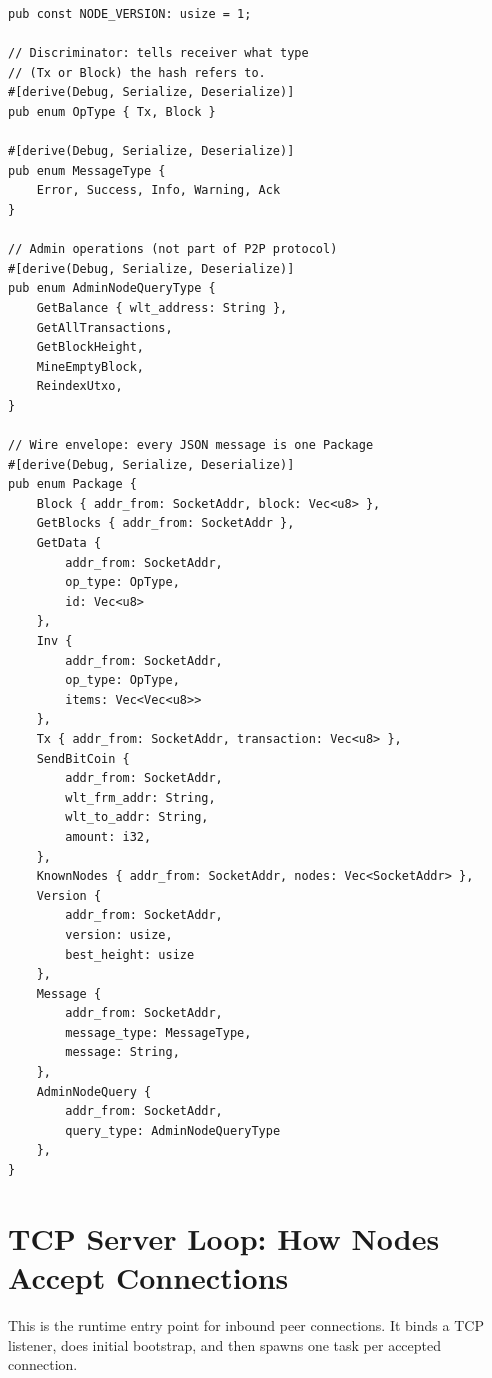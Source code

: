 \begin{listing}[htbp]
\caption{Network globals and message type enums}
\label{lst:ch12-message-model}
\begin{verbatim}
pub const NODE_VERSION: usize = 1;

// Discriminator: tells receiver what type
// (Tx or Block) the hash refers to.
#[derive(Debug, Serialize, Deserialize)]
pub enum OpType { Tx, Block }

#[derive(Debug, Serialize, Deserialize)]
pub enum MessageType {
    Error, Success, Info, Warning, Ack
}

// Admin operations (not part of P2P protocol)
#[derive(Debug, Serialize, Deserialize)]
pub enum AdminNodeQueryType {
    GetBalance { wlt_address: String },
    GetAllTransactions,
    GetBlockHeight,
    MineEmptyBlock,
    ReindexUtxo,
}

// Wire envelope: every JSON message is one Package
#[derive(Debug, Serialize, Deserialize)]
pub enum Package {
    Block { addr_from: SocketAddr, block: Vec<u8> },
    GetBlocks { addr_from: SocketAddr },
    GetData {
        addr_from: SocketAddr,
        op_type: OpType,
        id: Vec<u8>
    },
    Inv {
        addr_from: SocketAddr,
        op_type: OpType,
        items: Vec<Vec<u8>>
    },
    Tx { addr_from: SocketAddr, transaction: Vec<u8> },
    SendBitCoin {
        addr_from: SocketAddr,
        wlt_frm_addr: String,
        wlt_to_addr: String,
        amount: i32,
    },
    KnownNodes { addr_from: SocketAddr, nodes: Vec<SocketAddr> },
    Version {
        addr_from: SocketAddr,
        version: usize,
        best_height: usize
    },
    Message {
        addr_from: SocketAddr,
        message_type: MessageType,
        message: String,
    },
    AdminNodeQuery {
        addr_from: SocketAddr,
        query_type: AdminNodeQueryType
    },
}
\end{verbatim}
\end{listing}

\section{TCP Server Loop: How Nodes Accept Connections}
\label{sec:ch12-server-loop}

This is the runtime entry point for inbound peer connections. It binds a TCP listener, does initial bootstrap, and then spawns one task per accepted connection.

